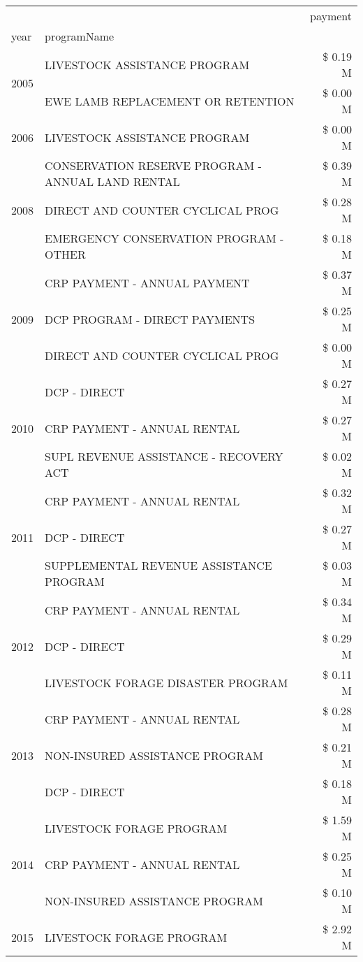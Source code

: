 \begin{tabular}{llr}
\toprule
 &  & payment \\
year & programName &  \\
\midrule
\multirow[t]{2}{*}{2005} & LIVESTOCK ASSISTANCE PROGRAM & \$ 0.19 M \\
 & EWE LAMB REPLACEMENT OR RETENTION & \$ 0.00 M \\
\cline{1-3}
2006 & LIVESTOCK ASSISTANCE PROGRAM & \$ 0.00 M \\
\cline{1-3}
\multirow[t]{3}{*}{2008} & CONSERVATION RESERVE PROGRAM - ANNUAL LAND RENTAL & \$ 0.39 M \\
 & DIRECT AND COUNTER CYCLICAL PROG & \$ 0.28 M \\
 & EMERGENCY CONSERVATION PROGRAM - OTHER & \$ 0.18 M \\
\cline{1-3}
\multirow[t]{3}{*}{2009} & CRP PAYMENT - ANNUAL PAYMENT & \$ 0.37 M \\
 & DCP PROGRAM - DIRECT PAYMENTS & \$ 0.25 M \\
 & DIRECT AND COUNTER CYCLICAL PROG & \$ 0.00 M \\
\cline{1-3}
\multirow[t]{3}{*}{2010} & DCP - DIRECT & \$ 0.27 M \\
 & CRP PAYMENT - ANNUAL RENTAL & \$ 0.27 M \\
 & SUPL REVENUE ASSISTANCE - RECOVERY ACT & \$ 0.02 M \\
\cline{1-3}
\multirow[t]{3}{*}{2011} & CRP PAYMENT - ANNUAL RENTAL & \$ 0.32 M \\
 & DCP - DIRECT & \$ 0.27 M \\
 & SUPPLEMENTAL REVENUE ASSISTANCE PROGRAM & \$ 0.03 M \\
\cline{1-3}
\multirow[t]{3}{*}{2012} & CRP PAYMENT - ANNUAL RENTAL & \$ 0.34 M \\
 & DCP - DIRECT & \$ 0.29 M \\
 & LIVESTOCK FORAGE DISASTER PROGRAM & \$ 0.11 M \\
\cline{1-3}
\multirow[t]{3}{*}{2013} & CRP PAYMENT - ANNUAL RENTAL & \$ 0.28 M \\
 & NON-INSURED ASSISTANCE PROGRAM & \$ 0.21 M \\
 & DCP - DIRECT & \$ 0.18 M \\
\cline{1-3}
\multirow[t]{3}{*}{2014} & LIVESTOCK FORAGE PROGRAM & \$ 1.59 M \\
 & CRP PAYMENT - ANNUAL RENTAL & \$ 0.25 M \\
 & NON-INSURED ASSISTANCE PROGRAM & \$ 0.10 M \\
\cline{1-3}
\multirow[t]{3}{*}{2015} & LIVESTOCK FORAGE PROGRAM & \$ 2.92 M \\

\end{tabular}
